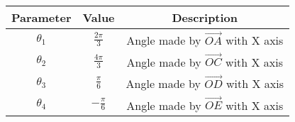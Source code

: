 
\begin{center}
\begin{tabular}{|c|c|c|}
\hline
	\textbf{Parameter}& \textbf{Value}& \textbf{Description}\\ \hline
	$\theta_1$	&$\frac{2\pi}{3}$	&Angle made by $\vec{OA}$ with X axis\\ \hline
	$\theta_2$	&$\frac{4\pi}{3}$	&Angle made by $\vec{OC}$ with X axis\\ \hline
	$\theta_3$	&$\frac{\pi}{6}$        &Angle made by $\vec{OD}$ with X axis\\ \hline
	$\theta_4$	&$-\frac{\pi}{6}$       &Angle made by $\vec{OE}$ with X axis\\ \hline
\end{tabular}
\end{center}
